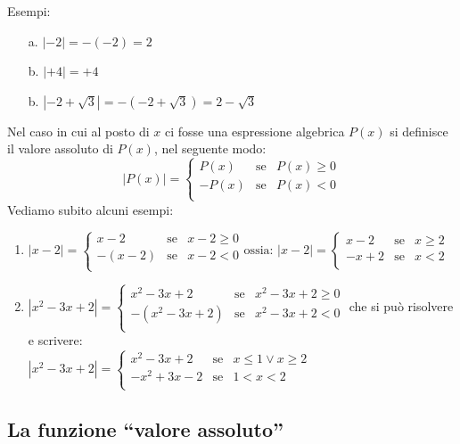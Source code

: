 Esempi:
\begin{enumerate}
\item[a.]
$|-2|=-(-2)=2$
\item[b.]
$|+4|=+4$
\item[b.]
$|-2+\sqrt{3}|=-(-2+\sqrt{3})=2-\sqrt{3}$
\end{enumerate} 
Nel caso in cui al posto di $x$ ci fosse una espressione algebrica  $P(x)$ si 
definisce il valore assoluto di $P(x)$, nel seguente modo:
$$|P(x)|=\left\lbrace 
\begin{array}{lcl}
P(x) & \text{se} & P(x)\geq 0 \\
-P(x) & \text{se} & P(x)< 0 \\
\end{array}
\right. 
$$
Vediamo subito alcuni esempi:
\begin{enumerate}
\item
$|x-2|=\left\lbrace 
\begin{array}{lcl}
x-2 & \text{se} & x-2\geq 0 \\
-(x-2) & \text{se} & x-2< 0 \\
\end{array}
\right.
\text{ossia: }
|x-2|=\left\lbrace 
\begin{array}{lcl}
x-2 & \text{se} & x\geq 2 \\
-x+2 & \text{se} & x<2 \\
\end{array}
\right.
$
\item
$|x^2-3x+2|=\left\lbrace 
\begin{array}{lcl}
x^2-3x+2 & \text{se} & x^2-3x+2\geq 0 \\
-(x^2-3x+2) & \text{se} & x^2-3x+2< 0 \\
\end{array}
\right.$
che si può risolvere e scrivere:\\[0.2cm]
$
|x^2-3x+2|=\left\lbrace 
\begin{array}{lcl}
x^2-3x+2 & \text{se} & x\leq 1 \vee x\geq 2 \\
-x^2+3x-2 & \text{se} & 1<x<2 \\
\end{array}
\right.
$
\end{enumerate}

\subsection{La funzione ``valore assoluto''}

